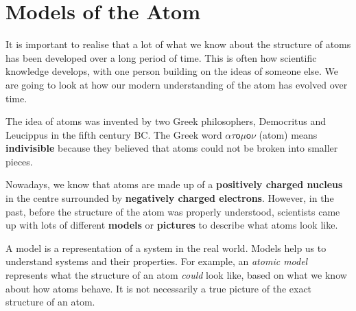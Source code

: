            \section{Models of the Atom}
            \nopagebreak
      \label{m38756*id254164}It is important to realise that a lot of what we know about the structure of atoms has been developed over a long period of time. This is often how scientific knowledge develops, with one person building on the ideas of someone else. We are going to look at how our modern understanding of the atom has evolved over time.\par 
      \label{m38756*id254508}The idea of atoms was invented by two Greek philosophers, Democritus and Leucippus in the fifth century BC. The Greek word $\mathsf{\alpha \tau o\mu o\nu }$ \hspace{1ex} (atom) means \textbf{indivisible} because they believed that atoms could not be broken into smaller pieces.\par 
      \label{m38756*id254540}Nowadays, we know that atoms are made up of a \textbf{positively charged nucleus} in the centre
surrounded by \textbf{negatively charged electrons}. However, in the past, before the structure of the atom was properly understood, scientists came up with lots of different \textbf{models} or \textbf{pictures} to describe what atoms look like.\par 

 { \label{m38756*meaningfhsst!!!underscore!!!id72}
      \label{m38756*id254584}A model is a representation of a system in the real world. Models help us to understand systems and their properties. For example, an \textsl{atomic model} represents what the structure of an atom \textsl{could} look like, based on what we know about how atoms behave. It is not necessarily a true picture of the exact structure of an atom. \par 
       } 
\vspace{-1cm}
